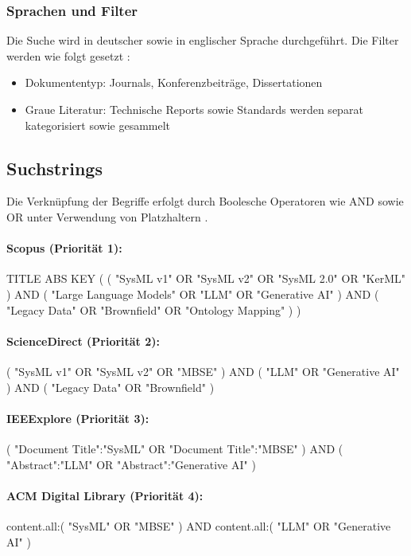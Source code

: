 \subsubsection{Sprachen und Filter}

Die Suche wird in deutscher sowie in englischer Sprache durchgeführt. Die Filter werden wie folgt gesetzt \cite{Higgins.2019}:
\begin{itemize}
    \item Dokumententyp: Journals, Konferenzbeiträge, Dissertationen
    \item Graue Literatur: Technische Reports sowie Standards werden separat kategorisiert sowie gesammelt
\end{itemize}

\subsection{Suchstrings}

Die Verknüpfung der Begriffe erfolgt durch Boolesche Operatoren wie AND sowie OR unter Verwendung von Platzhaltern \cite{Jha.2022}.

\paragraph{Scopus (Priorität 1):}
TITLE ABS KEY ( ( "SysML v1" OR "SysML v2" OR "SysML 2.0" OR "KerML" ) AND ( "Large Language Models" OR "LLM" OR "Generative AI" ) AND ( "Legacy Data" OR "Brownfield" OR "Ontology Mapping" ) )

\paragraph{ScienceDirect (Priorität 2):}
( "SysML v1" OR "SysML v2" OR "MBSE" ) AND ( "LLM" OR "Generative AI" ) AND ( "Legacy Data" OR "Brownfield" )

\paragraph{IEEExplore (Priorität 3):}
( "Document Title":"SysML" OR "Document Title":"MBSE" ) AND ( "Abstract":"LLM" OR "Abstract":"Generative AI" )

\paragraph{ACM Digital Library (Priorität 4):}
content.all:( "SysML" OR "MBSE" ) AND content.all:( "LLM" OR "Generative AI" )


